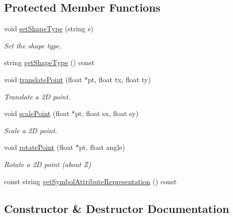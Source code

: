 \subsection*{Protected Member Functions}
\begin{DoxyCompactItemize}
\item 
void \mbox{\hyperlink{classbridges_1_1datastructure_1_1_symbol_add56ff3bb5b276c016cfe377ff0f3fe2}{set\+Shape\+Type}} (string s)
\begin{DoxyCompactList}\small\item\em Set the shape type. \end{DoxyCompactList}\item 
string \mbox{\hyperlink{classbridges_1_1datastructure_1_1_symbol_a8f8378ed4009865611ce8b93e4432211}{get\+Shape\+Type}} () const
\item 
void \mbox{\hyperlink{classbridges_1_1datastructure_1_1_symbol_a3331549f82faa00d8fee5f51ca547cb0}{translate\+Point}} (float $\ast$pt, float tx, float ty)
\begin{DoxyCompactList}\small\item\em Translate a 2D point. \end{DoxyCompactList}\item 
void \mbox{\hyperlink{classbridges_1_1datastructure_1_1_symbol_ac27131f6461a763e55f1127f3cf87932}{scale\+Point}} (float $\ast$pt, float sx, float sy)
\begin{DoxyCompactList}\small\item\em Scale a 2D point. \end{DoxyCompactList}\item 
void \mbox{\hyperlink{classbridges_1_1datastructure_1_1_symbol_ad40678e04bae69b4c03881148678e71e}{rotate\+Point}} (float $\ast$pt, float angle)
\begin{DoxyCompactList}\small\item\em Rotate a 2D point (about Z) \end{DoxyCompactList}\item 
const string \mbox{\hyperlink{classbridges_1_1datastructure_1_1_symbol_ab9a92e73867a95e8cc3e63cad75d266a}{get\+Symbol\+Attribute\+Representation}} () const
\end{DoxyCompactItemize}


\subsection{Constructor \& Destructor Documentation}
\mbox{\label{classbridges_1_1datastructure_1_1_symbol_a6169106c021d20752abba3cd266ecfb0}} 
